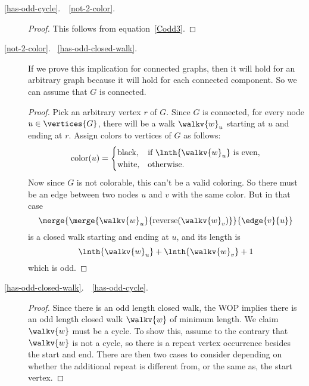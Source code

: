 \begin{description}

\item[\ref{has-odd-cycle}.\ \QIMPLIES\ \ref{not-2-color}.]
\begin{proof}
This follows from equation~\ref{Codd3}.
\end{proof}

\item[\ref{not-2-color}. \QIMPLIES\ \ref{has-odd-closed-walk}.]

  If we prove this implication for connected graphs, then it will hold
  for an arbitrary graph because it will hold for each
  connected component.  So we can assume that $G$ is connected.
\begin{proof}

  Pick an arbitrary vertex $r$ of $G$.  Since $G$ is connected, for every
  node $u \in \vertices{G}$, there will be a walk $\walkv{w}_u$ starting
  at $u$ and ending at $r$.  Assign colors to vertices of $G$ as follows:
\[
\text{color}(u) = \begin{cases}
                   \text{black}, & \text{if $\lnth{\walkv{w}_u}$ is even},\\
                   \text{white}, & \text{otherwise}.
\end{cases}
\]
Now since $G$ is not colorable, this can't be a valid coloring.  So there
must be an edge between two nodes $u$ and $v$ with the same color.  But in
that case
\[
\merge{\merge{\walkv{w}_u}{\text{reverse}(\walkv{w}_v)}}{\edge{v}{u}}
\]
is a closed walk starting and ending at $u$, and its length is
\[
\lnth{\walkv{w}_u} + \lnth{\walkv{w}_v} + 1
\]
which is odd.
\end{proof}

\item[\ref{has-odd-closed-walk}.\ \QIMPLIES\ \ref{has-odd-cycle}.]

\begin{proof}
  Since there is an odd length closed walk, the WOP implies there is an odd
  length closed walk $\walkv{w}$ of minimum length.  We claim $\walkv{w}$
  must be a cycle.  To show this, assume to the contrary that
  $\walkv{w}$ is not a cycle, so there is a repeat vertex occurrence
  besides the start and end.   There are then two cases to consider depending on
whether the additional repeat is different from, or the same as, the
start vertex.


\end{proof}
\end{description}
